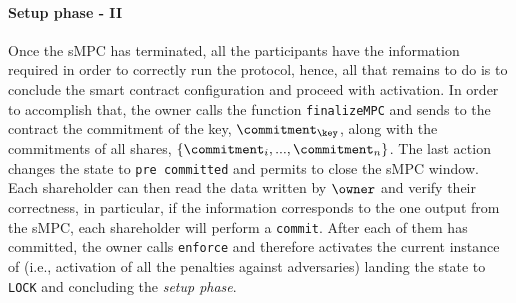 \paragraph{Setup phase - II}
Once the sMPC has terminated, all the participants have the information required in order to correctly run the protocol, hence, all that remains to do is to conclude the smart contract configuration and proceed with \shortname activation. In order to accomplish that, the owner calls the function \texttt{finalizeMPC} and sends to the contract the commitment of the key, $ \commitment _\key $, along with the commitments of all shares, $\{ \commitment _i , ... , \commitment _n \}$. The last action changes the state to \texttt{pre committed} and permits to close the sMPC window. Each shareholder can then read the data written by $\owner$ and verify their correctness, in particular, if the information corresponds to the one output from the sMPC, each shareholder will perform a \texttt{commit}. After each of them has committed, the owner calls \texttt{enforce} and therefore activates the current instance of \shortname (i.e., activation of all the penalties against adversaries) landing the state to \texttt{LOCK} and concluding the {\em setup phase}. 

